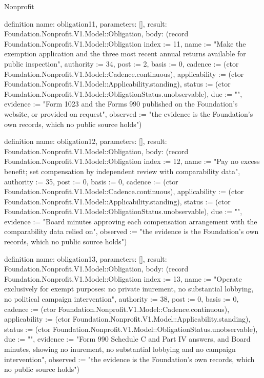 \begin{lexlean}{Nonprofit}
\begin{semanticmodule}
definition{
  name: obligation11,
  parameters: [],
  result: Foundation.Nonprofit.V1.Model::Obligation,
  body: (record Foundation.Nonprofit.V1.Model::Obligation {index := 11, name := "Make the exemption application and the three most recent annual returns available for public inspection", authority := 34, post := 2, basis := 0, cadence := (ctor Foundation.Nonprofit.V1.Model::Cadence.continuous), applicability := (ctor Foundation.Nonprofit.V1.Model::Applicability.standing), status := (ctor Foundation.Nonprofit.V1.Model::ObligationStatus.unobservable), due := "", evidence := "Form 1023 and the Forms 990 published on the Foundation's website, or provided on request", observed := "the evidence is the Foundation’s own records, which no public source holds"})
}

definition{
  name: obligation12,
  parameters: [],
  result: Foundation.Nonprofit.V1.Model::Obligation,
  body: (record Foundation.Nonprofit.V1.Model::Obligation {index := 12, name := "Pay no excess benefit; set compensation by independent review with comparability data", authority := 35, post := 0, basis := 0, cadence := (ctor Foundation.Nonprofit.V1.Model::Cadence.continuous), applicability := (ctor Foundation.Nonprofit.V1.Model::Applicability.standing), status := (ctor Foundation.Nonprofit.V1.Model::ObligationStatus.unobservable), due := "", evidence := "Board minutes approving each compensation arrangement with the comparability data relied on", observed := "the evidence is the Foundation’s own records, which no public source holds"})
}

definition{
  name: obligation13,
  parameters: [],
  result: Foundation.Nonprofit.V1.Model::Obligation,
  body: (record Foundation.Nonprofit.V1.Model::Obligation {index := 13, name := "Operate exclusively for exempt purposes: no private inurement, no substantial lobbying, no political campaign intervention", authority := 38, post := 0, basis := 0, cadence := (ctor Foundation.Nonprofit.V1.Model::Cadence.continuous), applicability := (ctor Foundation.Nonprofit.V1.Model::Applicability.standing), status := (ctor Foundation.Nonprofit.V1.Model::ObligationStatus.unobservable), due := "", evidence := "Form 990 Schedule C and Part IV answers, and Board minutes, showing no inurement, no substantial lobbying and no campaign intervention", observed := "the evidence is the Foundation’s own records, which no public source holds"})
}


\end{semanticmodule}
\end{lexlean}
